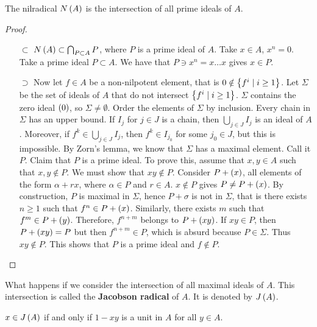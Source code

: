 \begin{proposition}
The nilradical $ N\br{A} $ is the intersection of all prime ideals of $ A $.
\end{proposition}

\begin{proof}
\hfill
\begin{itemize}
\item[$ \subset $] $ N\br{A} \subset \bigcap_{P \subset A} P $, where $ P $ is a prime ideal of $ A $. Take $ x \in A $, $ x^n = 0 $. Take a prime ideal $ P \subset A $. We have that $ P \ni x^n = x \dots x $ gives $ x \in P $.
\item[$ \supset $] Now let $ f \in A $ be a non-nilpotent element, that is $ 0 \notin \cbr{f^i \mid i \ge 1} $. Let $ \Sigma $ be the set of ideals of $ A $ that do not intersect $ \cbr{f^i \mid i \ge 1} $. $ \Sigma $ contains the zero ideal $ \br{0} $, so $ \Sigma \ne \emptyset $. Order the elements of $ \Sigma $ by inclusion. Every chain in $ \Sigma $ has an upper bound. If $ I_j $ for $ j \in J $ is a chain, then $ \bigcup_{j \in J} I_j $ is an ideal of $ A $. Moreover, if $ f^k \in \bigcup_{j \in J} I_j $, then $ f^k \in I_{j_0} $ for some $ j_0 \in J $, but this is impossible. By Zorn's lemma, we know that $ \Sigma $ has a maximal element. Call it $ P $. Claim that $ P $ is a prime ideal. To prove this, assume that $ x, y \in A $ such that $ x, y \notin P $. We must show that $ xy \notin P $. Consider $ P + \br{x} $, all elements of the form $ \alpha + rx $, where $ \alpha \in P $ and $ r \in A $. $ x \notin P $ gives $ P \ne P + \br{x} $. By construction, $ P $ is maximal in $ \Sigma $, hence $ P + \sigma $ is not in $ \Sigma $, that is there exists $ n \ge 1 $ such that $ f^n \in P + \br{x} $. Similarly, there exists $ m $ such that $ f^m \in P + \br{y} $. Therefore, $ f^{n + m} $ belongs to $ P + \br{xy} $. If $ xy \in P $, then $ P + \br{xy} = P $ but then $ f^{n + m} \in P $, which is absurd because $ P \in \Sigma $. Thus $ xy \notin P $. This shows that $ P $ is a prime ideal and $ f \notin P $.
\end{itemize}
\end{proof}

What happens if we consider the intersection of all maximal ideals of $ A $. This intersection is called the \textbf{Jacobson radical} of $ A $. It is denoted by $ J\br{A} $.

\begin{proposition}
\label{prop:5.3}
$ x \in J\br{A} $ if and only if $ 1 - xy $ is a unit in $ A $ for all $ y \in A $.
\end{proposition}

